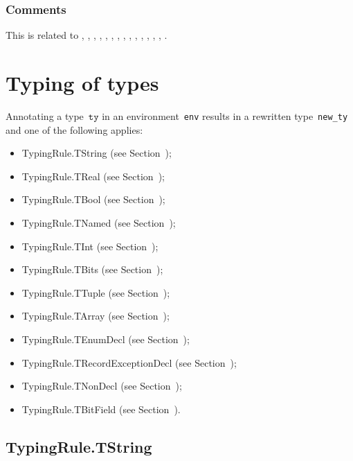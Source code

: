 \documentclass{book}
\newcommand\tty[0]{\texttt{ty}}
\begin{document}
\begin{itemize}
\begin{emptyformal}
\end{emptyformal}

\subsection{Comments}
  This is related to , , ,
  , , , , ,
  , , , , ,
  , .

\chapter{Typing of types}

Annotating a type~$\tty$ in an environment~\texttt{env} results in a
rewritten type~\texttt{new\_ty} and one of the following applies:
\begin{itemize}
  \item TypingRule.TString (see Section~);
  \item TypingRule.TReal (see Section~);
  \item TypingRule.TBool (see Section~);
  \item TypingRule.TNamed (see Section~);
  \item TypingRule.TInt (see Section~);
  \item TypingRule.TBits (see Section~);
  \item TypingRule.TTuple (see Section~);
  \item TypingRule.TArray (see Section~);
  \item TypingRule.TEnumDecl (see Section~);
  \item TypingRule.TRecordExceptionDecl (see
    Section~);
  \item TypingRule.TNonDecl (see Section~);
  \item TypingRule.TBitField (see Section~).
\end{itemize}


\section{TypingRule.TString \label{sec:TypingRule.TString}}


\end{itemize}
\end{document}
